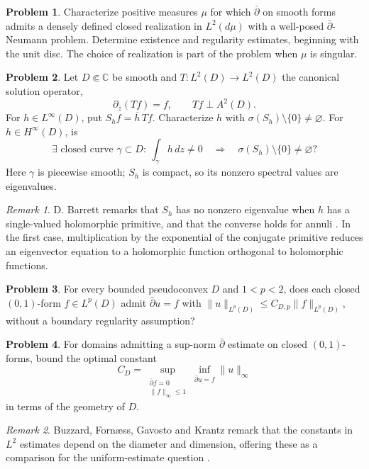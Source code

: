 \documentclass[11pt,reqno]{amsart}
\theoremstyle{definition}
\newtheorem{problem}{Problem}[section]
\theoremstyle{remark}
\newtheorem*{remark}{Remark}
\begin{document}
\begin{problem}\label{b95-6-1-2}
Characterize positive measures $\mu$ for which $\bar\partial$ on smooth forms admits a densely defined closed realization in $L^2(d\mu)$ with a well-posed $\bar\partial$-Neumann problem. Determine existence and regularity estimates, beginning with the unit disc. The choice of realization is part of the problem when $\mu$ is singular.
\end{problem}


\begin{problem}\label{b95-6-1-3}
Let $D\Subset\mathbb C$ be smooth and $T:L^2(D)\to L^2(D)$ the canonical solution operator,
\[
 \partial_{\bar z}(Tf)=f,\qquad Tf\perp A^2(D).
\]
For $h\in L^\infty(D)$, put $S_hf=\overline h\,Tf$. Characterize $h$ with $\sigma(S_h)\setminus\{0\}\ne\varnothing$. For $h\in H^\infty(D)$, is
\[
 \exists\text{ closed curve }\gamma\subset D:\ \int_\gamma h\,dz\ne0
 \quad\Longrightarrow\quad \sigma(S_h)\setminus\{0\}\ne\varnothing?
\]
Here $\gamma$ is piecewise smooth; $S_h$ is compact, so its nonzero spectral values are eigenvalues.
\end{problem}
\begin{remark}
D. Barrett remarks that $S_h$ has no nonzero eigenvalue when $h$ has a single-valued holomorphic primitive, and that the converse holds for annuli \cite[Problem~6.1.3, 1995]{B95}. In the first case, multiplication by the exponential of the conjugate primitive reduces an eigenvector equation to a holomorphic function orthogonal to holomorphic functions.
\end{remark}

\begin{problem}\label{b95-6-3-1}
For every bounded pseudoconvex $D$ and $1<p<2$, does each closed $(0,1)$-form $f\in L^p(D)$ admit $\bar\partial u=f$ with $\|u\|_{L^p(D)}\leq C_{D,p}\|f\|_{L^p(D)}$, without a boundary regularity assumption?
\end{problem}


\begin{problem}\label{b95-6-4-2}
For domains admitting a sup-norm $\bar\partial$ estimate on closed $(0,1)$-forms, bound the optimal constant
\[
 C_D=\sup_{\substack{\bar\partial f=0\\\|f\|_\infty\leq1}}
       \inf_{\bar\partial u=f}\|u\|_\infty
\]
in terms of the geometry of $D$.
\end{problem}
\begin{remark}
Buzzard, Forn\ae ss, Gavosto and Krantz remark that the constants in $L^2$ estimates depend on the diameter and dimension, offering these as a comparison for the uniform-estimate question \cite[Problem~6.4.2, 1995]{B95}.
\end{remark}
\end{document}
